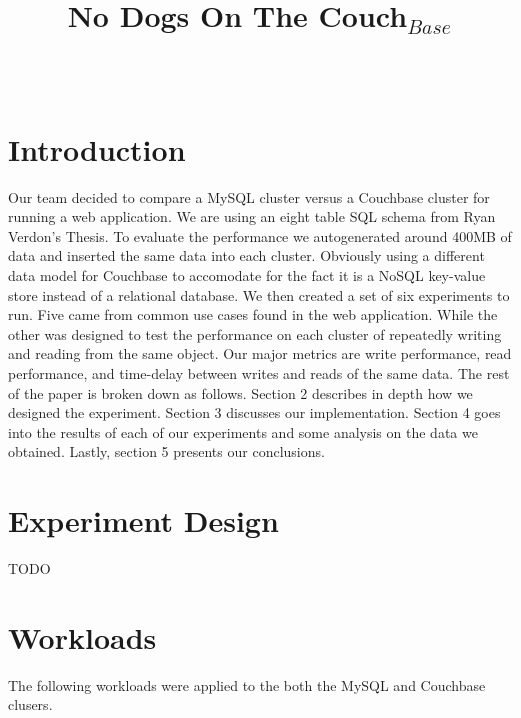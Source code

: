 \documentclass[]{IEEEtran}
\begin{document}
\title{No Dogs On The Couch$_{Base}$}


\author{
\\
}

\maketitle

\thispagestyle{empty}
\pagestyle{empty}

\section{Introduction}
Our team decided to compare a MySQL cluster versus a Couchbase cluster for running a
web application. We are using an eight table SQL schema from Ryan Verdon's Thesis. To evaluate
the performance we autogenerated around 400MB of data and inserted the same data into each cluster.
Obviously using a different data model for Couchbase to accomodate for the fact it is a NoSQL key-value store
instead of a relational database. We then created a set of six experiments to run. Five came from common 
use cases found in the web application. While the other was designed to test the performance on each cluster
of repeatedly writing and reading from the same object. Our major metrics are write performance, read performance,
and time-delay between writes and reads of the same data. The rest of the paper is broken down as follows.
Section 2 describes in depth how we designed the experiment. Section 3 discusses our implementation. Section 4 goes
into the results of each of our experiments and some analysis on the data we obtained. Lastly, section 5 presents 
our conclusions.

\section{Experiment Design}
TODO

\section{Workloads}
The following workloads were applied to the both the MySQL and Couchbase clusers.
\end{document}
